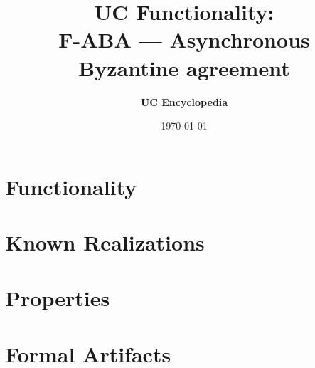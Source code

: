 \documentclass[11pt,a4paper]{article}
\title{\textbf{\Large UC Functionality:}\\[0.2em] \Large F-ABA --- Asynchronous Byzantine agreement}
\author{\textbf{UC Encyclopedia}}
\date{\today}
\newtheorem{functionality}{Functionality}
\begin{document}
\maketitle

\begin{abstract}
\end{abstract}

\section{Functionality}

%

\section{Known Realizations}


\section{Properties}


\section{Formal Artifacts}

\end{document}
